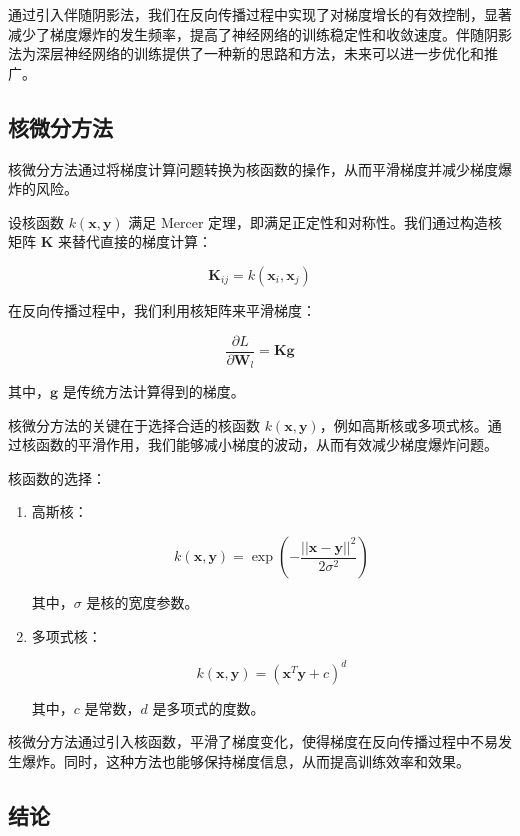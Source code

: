 \documentclass[12pt,a4paper]{amsart}
\begin{document}
通过引入伴随阴影法，我们在反向传播过程中实现了对梯度增长的有效控制，显著减少了梯度爆炸的发生频率，提高了神经网络的训练稳定性和收敛速度。伴随阴影法为深层神经网络的训练提供了一种新的思路和方法，未来可以进一步优化和推广。

\subsection{核微分方法}

核微分方法通过将梯度计算问题转换为核函数的操作，从而平滑梯度并减少梯度爆炸的风险。

设核函数 \(k(\mathbf{x}, \mathbf{y})\) 满足 Mercer 定理，即满足正定性和对称性。我们通过构造核矩阵 \(\mathbf{K}\) 来替代直接的梯度计算：

\[ \mathbf{K}_{ij} = k(\mathbf{x}_i, \mathbf{x}_j) \]

在反向传播过程中，我们利用核矩阵来平滑梯度：

\[ \frac{\partial L}{\partial \mathbf{W}_l} = \mathbf{K} \mathbf{g} \]

其中，\(\mathbf{g}\) 是传统方法计算得到的梯度。

核微分方法的关键在于选择合适的核函数 \(k(\mathbf{x}, \mathbf{y})\)，例如高斯核或多项式核。通过核函数的平滑作用，我们能够减小梯度的波动，从而有效减少梯度爆炸问题。

核函数的选择：

\begin{enumerate}

\item 高斯核：

\[ k(\mathbf{x}, \mathbf{y}) = \exp\left(-\frac{||\mathbf{x} - \mathbf{y}||^2}{2\sigma^2}\right) \]

其中，\(\sigma\) 是核的宽度参数。

\item 多项式核：

\[ k(\mathbf{x}, \mathbf{y}) = (\mathbf{x}^T \mathbf{y} + c)^d \]

其中，\(c\) 是常数，\(d\) 是多项式的度数。

\end{enumerate}

核微分方法通过引入核函数，平滑了梯度变化，使得梯度在反向传播过程中不易发生爆炸。同时，这种方法也能够保持梯度信息，从而提高训练效率和效果。

\subsection{结论}
\end{document}
